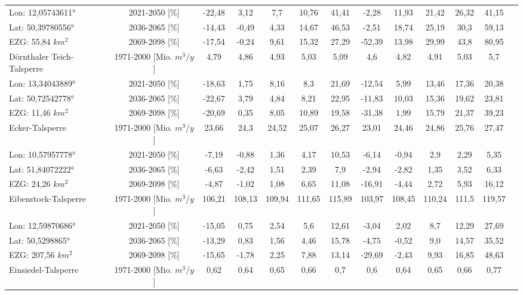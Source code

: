 \begin{longtable}{@{\extracolsep{\fill}}lc|ccccc||cccccc}
\cline{2-13} 
Lon: 12,05743611° & 2021-2050 [\%]  & -22,48 & 3,12 & 7,7 & 10,76 & 41,41 & -2,28 & 11,93 & 21,42 & 26,32 & 41,15 & \\ 
Lat: 50,39780556° & 2036-2065 [\%]  & -14,43 & -0,49 & 4,33 & 14,67 & 46,53 & -2,51 & 18,74 & 25,19 & 30,3 & 59,13 & \\ 
EZG: 55,84 $km^2$ & 2069-2098 [\%]  & -17,54 & -0,24 & 9,61 & 15,32 & 27,29 & -52,39 & 13,98 & 29,99 & 43,8 & 80,95 & \\ 
\hline 
Dörnthaler Teich-Talsperre & 1971-2000 [Mio. $m^3/y$]  & 4,79 & 4,86 & 4,93 & 5,03 & 5,09 & 4,6 & 4,82 & 4,91 & 5,03 & 5,7 & \\ 
\cline{2-13} 
Lon: 13,34043889° & 2021-2050 [\%]  & -18,63 & 1,75 & 8,16 & 8,3 & 21,69 & -12,54 & 5,99 & 13,46 & 17,36 & 20,38 & \\ 
Lat: 50,72542778° & 2036-2065 [\%]  & -22,67 & 3,79 & 4,84 & 8,21 & 22,95 & -11,83 & 10,03 & 15,36 & 19,62 & 23,81 & \\ 
EZG: 11,46 $km^2$ & 2069-2098 [\%]  & -20,69 & 0,35 & 8,05 & 10,89 & 19,58 & -31,38 & 1,99 & 15,79 & 21,37 & 39,23 & \\ 
\hline 
Ecker-Talsperre & 1971-2000 [Mio. $m^3/y$]  & 23,66 & 24,3 & 24,52 & 25,07 & 26,27 & 23,01 & 24,46 & 24,86 & 25,76 & 27,47 & \\ 
\cline{2-13} 
Lon: 10,57957778° & 2021-2050 [\%]  & -7,19 & -0,88 & 1,36 & 4,17 & 10,53 & -6,14 & -0,94 & 2,9 & 2,29 & 5,35 & \\ 
Lat: 51,84072222° & 2036-2065 [\%]  & -6,63 & -2,42 & 1,51 & 2,39 & 7,9 & -2,94 & -2,82 & 1,35 & 3,52 & 6,33 & \\ 
EZG: 24,26 $km^2$ & 2069-2098 [\%]  & -4,87 & -1,02 & 1,08 & 6,65 & 11,08 & -16,91 & -4,44 & 2,72 & 5,93 & 16,12 & \\ 
\hline 
Eibenstock-Talsperre & 1971-2000 [Mio. $m^3/y$]  & 106,21 & 108,13 & 109,94 & 111,65 & 115,89 & 103,97 & 108,45 & 110,24 & 111,5 & 119,57 & \\ 
\cline{2-13} 
Lon: 12,59870686° & 2021-2050 [\%]  & -15,05 & 0,75 & 2,54 & 5,6 & 12,61 & -3,04 & 2,02 & 8,7 & 12,29 & 27,69 & \\ 
Lat: 50,5298865° & 2036-2065 [\%]  & -13,29 & 0,83 & 1,56 & 4,46 & 15,78 & -4,75 & -0,52 & 9,0 & 14,57 & 35,52 & \\ 
EZG: 207,56 $km^2$ & 2069-2098 [\%]  & -15,65 & -1,78 & 2,25 & 7,88 & 13,14 & -29,69 & -2,43 & 9,93 & 16,85 & 48,63 & \\ 
\hline 
Einsiedel-Talsperre & 1971-2000 [Mio. $m^3/y$]  & 0,62 & 0,64 & 0,65 & 0,66 & 0,7 & 0,6 & 0,64 & 0,65 & 0,66 & 0,77 & \\ 

\end{longtable}
